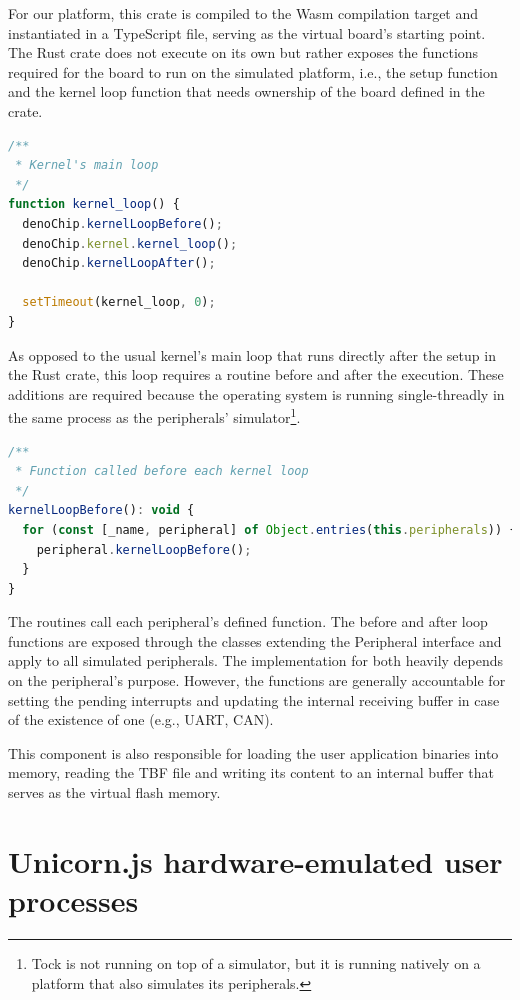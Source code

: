 \documentclass[12pt,a4paper]{report}
\begin{document}
For our platform, this crate is compiled to the Wasm compilation target and instantiated in a TypeScript file, serving as the virtual board's starting point. The Rust crate does not execute on its own but rather exposes the functions required for the board to run on the simulated platform, i.e., the setup function and the kernel loop function that needs ownership of the board defined in the crate.

\begin{lstlisting}[caption=Redefined kernel loop, language=JavaScript]
/**
 * Kernel's main loop
 */
function kernel_loop() {
  denoChip.kernelLoopBefore();
  denoChip.kernel.kernel_loop();
  denoChip.kernelLoopAfter();

  setTimeout(kernel_loop, 0);
}
\end{lstlisting}

As opposed to the usual kernel's main loop that runs directly after the setup in the Rust crate, this loop requires a routine before and after the execution. These additions are required because the operating system is running single-threadly in the same process as the peripherals' simulator\footnote{Tock is not running on top of a simulator, but it is running natively on a platform that also simulates its peripherals.}. 

\begin{lstlisting}[caption=Routine before the kernel's main loop, language=JavaScript]
/**
 * Function called before each kernel loop
 */
kernelLoopBefore(): void {
  for (const [_name, peripheral] of Object.entries(this.peripherals)) {
    peripheral.kernelLoopBefore();
  }
}
\end{lstlisting}

The routines call each peripheral's defined function. The before and after loop functions are exposed through the classes extending the Peripheral interface and apply to all simulated peripherals. The implementation for both heavily depends on the peripheral's purpose. However, the functions are generally accountable for setting the pending interrupts and updating the internal receiving buffer in case of the existence of one (e.g., UART, CAN).

This component is also responsible for loading the user application binaries into memory, reading the TBF file and writing its content to an internal buffer that serves as the virtual flash memory.

\section{Unicorn.js hardware-emulated user processes}
\end{document}
